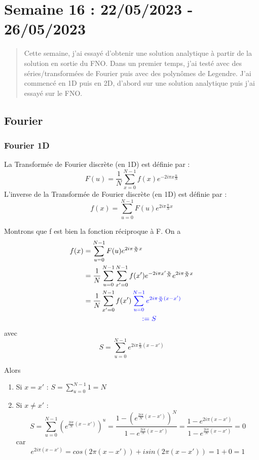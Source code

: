 \section{Semaine 16 : 22/05/2023 - 26/05/2023}
\graphicspath{{semaines/semaine_16/images/}}

\setcounter{equation}{0}

\begin{abstract}
	Cette semaine, j'ai essayé d'obtenir une solution analytique à partir de la solution en sortie du FNO. Dans un premier temps, j'ai testé avec des séries/transformées de Fourier puis avec des polynômes de Legendre. J'ai commencé en 1D puis en 2D, d'abord sur une solution analytique puis j'ai essayé sur le FNO.
\end{abstract}

\subsection{Fourier}

\subsubsection*{Fourier 1D}

La Transformée de Fourier discrète (en 1D) est définie par :
$$F(u)=\frac{1}{N}\sum_{x=0}^{N-1}f(x)e^{-2i\pi x\frac{u}{N}}$$
L'inverse de la Transformée de Fourier discrète (en 1D) est définie par :
$$f(x)=\sum_{u=0}^{N-1}F(u)e^{2i\pi \frac{u}{N}x}$$

Montrons que f est bien la fonction réciproque à F. On a 
\begin{align*}
	f(x)&=\sum_{u=0}^{N-1}F(u)e^{2i\pi \frac{u}{N}x} \\	
	&=\frac{1}{N}\sum_{u=0}^{N-1}\sum_{x'=0}^{N-1}f(x')e^{-2i\pi x'\frac{u}{N}}e^{2i\pi \frac{u}{N}x} \\
	&=\frac{1}{N}\sum_{x'=0}^{N-1}f(x')\color{blue}\sum_{u=0}^{N-1}e^{2i\pi \frac{u}{N}(x-x')}\color{black}\\
	& \qquad \qquad \qquad \qquad \color{blue}:= S \color{black}
\end{align*}
avec
$$S=\sum_{u=0}^{N-1}e^{2i\pi \frac{u}{N}(x-x')}$$

Alors
\begin{enumerate}[label=\textbullet]
	\item Si $x=x'$ : $S=\sum_{u=0}^{N-1}1=N$
	\item Si $x\ne x'$ : 
	$$S=\sum_{u=0}^{N-1}\left(e^{\frac{2i\pi}{N}(x-x')}\right)^u=\frac{1-\left(e^{\frac{2i\pi}{N}(x-x')}\right)^N}{1-e^{\frac{2i\pi}{N}(x-x')}}=\frac{1-e^{2i\pi(x-x')}}{1-e^{\frac{2i\pi}{N}(x-x')}}=0$$
	car
	$$e^{2i\pi(x-x')}=cos(2\pi(x-x'))+i sin(2\pi(x-x')) = 1+0 =1$$
\end{enumerate}

